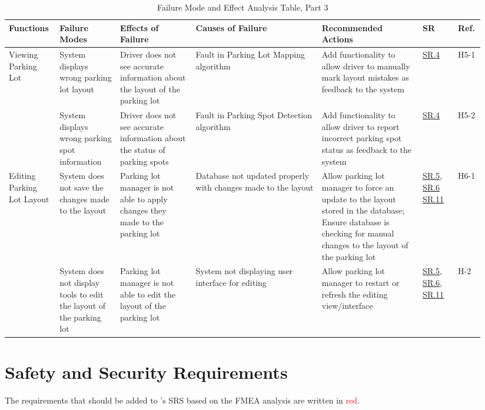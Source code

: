 \documentclass[12pt,letterpaper]{article}
\begin{document}
\begin{landscape}
\begin{table}[hp]
\begin{tabular}{|p{0.09\linewidth}|p{0.12\linewidth}|p{0.15\linewidth}|p{0.25\linewidth}|p{0.2\linewidth}|p{0.075\linewidth}|p{0.05\linewidth}|}
\hline
Functions & Failure Modes & Effects of Failure & Causes of Failure & Recommended
Actions & SR & Ref.\\
\hline
Viewing Parking Lot & System displays wrong parking lot layout & Driver does not
see accurate information about the layout of the parking lot & Fault in Parking
Lot Mapping algorithm & Add functionality to allow driver to manually mark
layout mistakes as feedback to the system & \hyperref[isr4]{SR.4} &
H5-1\\\cline{2-7} & System displays wrong parking spot information & Driver does
not see accurate information about the status of parking spots & Fault in
Parking Spot Detection algorithm & Add functionality to allow driver to report
incorrect parking spot status as feedback to the system & \hyperref[isr4]{SR.4}
& H5-2\\
\hline
Editing Parking Lot Layout & System does not save the changes made to the layout
& Parking lot manager is not able to apply changes they made to the parking lot
& Database not updated properly with changes made to the layout & Allow parking
lot manager to force an update to the layout stored in the database; Ensure
database is checking for manual changes to the layout of the parking lot &
\hyperref[isr5]{SR.5}, \hyperref[isr6]{SR.6} \hyperref[isr11]{SR.11} &
H6-1\\\cline{2-7} & System does not display tools to edit the layout of the
parking lot & Parking lot manager is not able to edit the layout of the parking
lot & System not displaying user interface for editing & Allow parking lot
manager to restart or refresh the editing view/interface &
\hyperref[isr5]{SR.5}, \hyperref[isr6]{SR.6}, \hyperref[isr11]{SR.11} & H-2\\
\hline
\end{tabular}
\caption{Failure Mode and Effect Analysis Table, Part 3} \label{TblFMEA3}
\end{table}

\end{landscape}

\newpage

\restoregeometry

\section{Safety and Security Requirements}
The requirements that should be added to \progname's SRS based on the FMEA
analysis are written in \textcolor{red}{red}.
\end{document}
